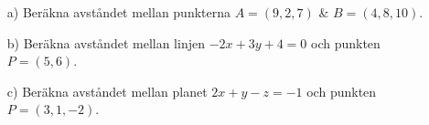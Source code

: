 \begin{itemize}
    \item[a) ] Beräkna avståndet mellan punkterna $A=(9,2,7)$ \& $B=(4,8,10)$.
    \item[b) ] Beräkna avståndet mellan linjen $-2x+3y+4=0$ och punkten 
               $P=(5,6)$.
    \item[c) ] Beräkna avståndet mellan planet $2x+y-z=-1$ och punkten 
               $P=(3,1,-2)$.
\end{itemize}